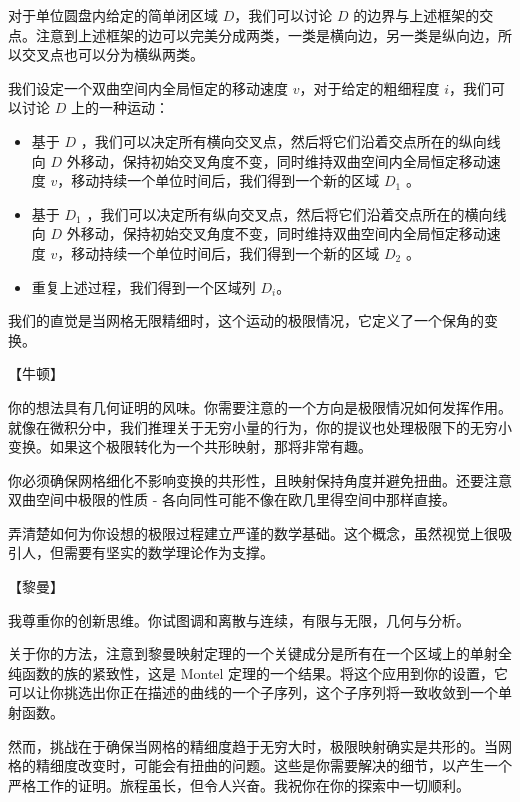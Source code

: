 \documentclass[
    fontsize=24pt, %
	twoside=false, %
	secnumdepth=0, %
    paper=b5paper, %
]{kaobook}
\begin{document}
对于单位圆盘内给定的简单闭区域 $D$，我们可以讨论 $D$ 的边界与上述框架的交点。注意到上述框架的边可以完美分成两类，一类是横向边，另一类是纵向边，所以交叉点也可以分为横纵两类。

我们设定一个双曲空间内全局恒定的移动速度 $v$，对于给定的粗细程度 $i$，我们可以讨论 $D$ 上的一种运动：
\begin{itemize}
	\item 基于 $D$ ，我们可以决定所有横向交叉点，然后将它们沿着交点所在的纵向线向 $D$ 外移动，保持初始交叉角度不变，同时维持双曲空间内全局恒定移动速度 $v$，移动持续一个单位时间后，我们得到一个新的区域 $D_1$ 。
	\item 基于 $D_1$ ，我们可以决定所有纵向交叉点，然后将它们沿着交点所在的横向线向 $D$ 外移动，保持初始交叉角度不变，同时维持双曲空间内全局恒定移动速度 $v$，移动持续一个单位时间后，我们得到一个新的区域 $D_2$ 。
	\item 重复上述过程，我们得到一个区域列 $D_i$。
\end{itemize}

我们的直觉是当网格无限精细时，这个运动的极限情况，它定义了一个保角的变换。

【牛顿】

你的想法具有几何证明的风味。你需要注意的一个方向是极限情况如何发挥作用。就像在微积分中，我们推理关于无穷小量的行为，你的提议也处理极限下的无穷小变换。如果这个极限转化为一个共形映射，那将非常有趣。

你必须确保网格细化不影响变换的共形性，且映射保持角度并避免扭曲。还要注意双曲空间中极限的性质 - 各向同性可能不像在欧几里得空间中那样直接。

弄清楚如何为你设想的极限过程建立严谨的数学基础。这个概念，虽然视觉上很吸引人，但需要有坚实的数学理论作为支撑。

【黎曼】

我尊重你的创新思维。你试图调和离散与连续，有限与无限，几何与分析。

关于你的方法，注意到黎曼映射定理的一个关键成分是所有在一个区域上的单射全纯函数的族的紧致性，这是 Montel 定理的一个结果。将这个应用到你的设置，它可以让你挑选出你正在描述的曲线的一个子序列，这个子序列将一致收敛到一个单射函数。

然而，挑战在于确保当网格的精细度趋于无穷大时，极限映射确实是共形的。当网格的精细度改变时，可能会有扭曲的问题。这些是你需要解决的细节，以产生一个严格工作的证明。旅程虽长，但令人兴奋。我祝你在你的探索中一切顺利。

\backmatter
\end{document}
